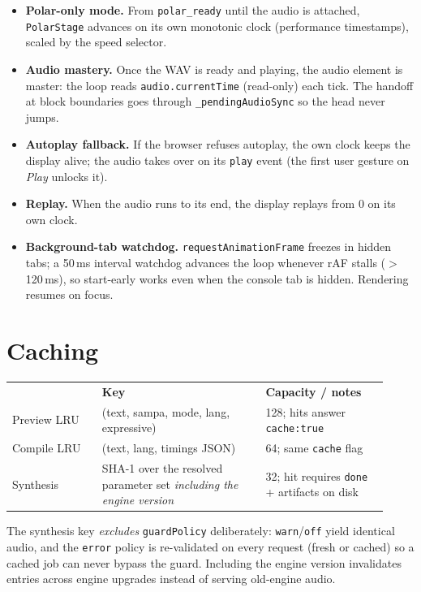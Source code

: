 \documentclass[11pt,a4paper]{article}
\begin{document}
\begin{itemize}
\item \textbf{Polar-only mode.} From \texttt{polar\_ready} until the
  audio is attached, \texttt{PolarStage} advances on its own monotonic
  clock (performance timestamps), scaled by the speed selector.
\item \textbf{Audio mastery.} Once the WAV is ready and playing, the
  audio element is master: the loop reads \texttt{audio.currentTime}
  (read-only) each tick. The handoff at block boundaries goes through
  \texttt{\_pendingAudioSync} so the head never jumps.
\item \textbf{Autoplay fallback.} If the browser refuses autoplay, the
  own clock keeps the display alive; the audio takes over on its
  \texttt{play} event (the first user gesture on \emph{Play} unlocks it).
\item \textbf{Replay.} When the audio runs to its end, the display
  replays from 0 on its own clock.
\item \textbf{Background-tab watchdog.} \texttt{requestAnimationFrame}
  freezes in hidden tabs; a 50\,ms interval watchdog advances the loop
  whenever rAF stalls ($>$120\,ms), so start-early works even when the
  console tab is hidden. Rendering resumes on focus.
\end{itemize}

\section{Caching}

\begin{longtable}{p{0.22\linewidth}p{0.40\linewidth}p{0.30\linewidth}}
 & \textbf{Key} & \textbf{Capacity / notes} \\
Preview LRU & (text, sampa, mode, lang, expressive) & 128; hits answer
\texttt{cache:true} \\
Compile LRU & (text, lang, timings JSON) & 64; same \texttt{cache} flag \\
Synthesis & SHA-1 over the resolved parameter set \emph{including the
engine version} & 32; hit requires \texttt{done} + artifacts on disk \\
\end{longtable}

The synthesis key \emph{excludes} \texttt{guardPolicy} deliberately:
\texttt{warn}/\texttt{off} yield identical audio, and the
\texttt{error} policy is re-validated on every request (fresh or cached)
so a cached job can never bypass the guard. Including the engine version
invalidates entries across engine upgrades instead of serving old-engine
audio.
\end{document}
